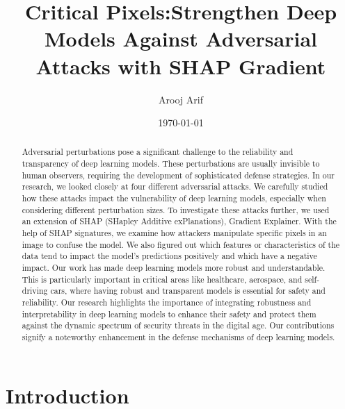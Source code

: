 \documentclass[10pt, conference, a4paper, final]{IEEEtran}
\title{Critical Pixels:Strengthen Deep Models Against Adversarial Attacks with SHAP Gradient }
\author{Arooj Arif}
\date{\today} %
\begin{document}
\maketitle %


\begin{abstract}    
    Adversarial perturbations pose a significant challenge to the reliability and transparency of deep learning models. These perturbations are usually invisible to human observers, requiring the development of sophisticated defense strategies. In our research, we looked closely at four different adversarial attacks. We carefully studied how these attacks impact the vulnerability of deep learning models, especially when considering different perturbation sizes. To investigate these attacks further, we used an extension of SHAP (SHapley Additive exPlanations), Gradient Explainer. With the help of SHAP signatures, we examine how attackers manipulate specific pixels in an image to confuse the model. We also figured out which features or characteristics of the data tend to impact the model's predictions positively and which have a negative impact. Our work has made deep learning models more robust and understandable. This is particularly important in critical areas like healthcare, aerospace, and self-driving cars, where having robust and transparent models is essential for safety and reliability. Our research highlights the importance of integrating robustness and interpretability in deep learning models to enhance their safety and protect them against the dynamic spectrum of security threats in the digital age. Our contributions signify a noteworthy enhancement in the defense mechanisms of deep learning models.


\end{abstract}

\section{Introduction}
\end{document}
